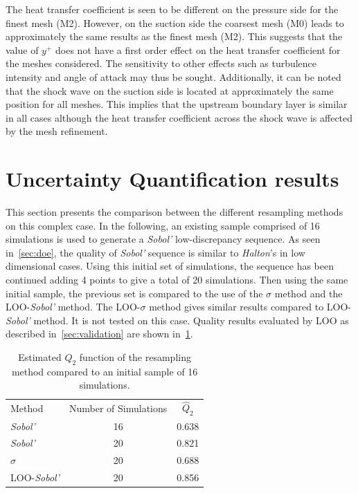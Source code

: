 The heat transfer coefficient is seen to be different on the pressure side for the finest mesh (M2). However, on the suction side the coarsest mesh (M0) leads to approximately the same results as the finest mesh (M2). This suggests that the value of $y^+$ does not have a first order effect on the heat transfer coefficient for the meshes considered. The sensitivity to other effects such as turbulence intensity and angle of attack may thus be sought. Additionally, it can be noted that the shock wave on the suction side is located at approximately the same position for all meshes. This implies that the upstream boundary layer is similar in all cases although the heat transfer coefficient across the shock wave is affected by the mesh refinement.

\section{Uncertainty Quantification results}\label{sec:ls89_results}

This section presents the comparison between the different resampling methods on this complex case. In the following, an existing sample comprised of 16 simulations is used to generate a \textit{Sobol'} low-discrepancy sequence. As seen in~\cref{sec:doe}, the quality of \textit{Sobol'} sequence is similar to \textit{Halton}'s in low dimensional cases. Using this initial set of simulations, the sequence has been continued adding 4 points to give a total of 20 simulations. Then using the same initial sample, the previous set is compared to the use of the $\sigma$ method and the LOO-\textit{Sobol'} method. The LOO-$\sigma$ method gives similar results compared to LOO-\textit{Sobol'} method. It is not tested on this case. Quality results evaluated by LOO as described in~\cref{sec:validation} are shown in~\cref{tab:ls89-q2}. 

\begin{table}[h]
\centering
\begin{tabular}{lcc}
\toprule
Method & Number of Simulations &$\hat{Q}_2$\\
\cmidrule{2-3}
\textit{Sobol'}&16 & 0.638\\
\textit{Sobol'}&20& 0.821\\
\textit{$\sigma$}&20& 0.688\\
LOO-\textit{Sobol'}&20& 0.856\\
\bottomrule
\end{tabular}
\caption{Estimated $Q_2$ function of the resampling method compared to an initial sample of 16 simulations.}
\label{tab:ls89-q2}
\end{table}

